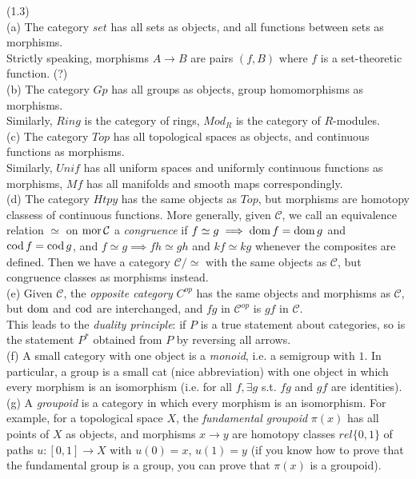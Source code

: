 \documentclass[a4paper]{article}
\begin{document}
\begin{eg} (1.3)\\
    (a) The category $set$ has all sets as objects, and all functions between sets as morphisms.\\
    Strictly speaking, morphisms $A \to B$ are pairs $(f,B)$ where $f$ is a set-theoretic function. (?)\\
    (b) The category $Gp$ has all groups as objects, group homomorphisms as morphisms.\\
    Similarly, $Ring$ is the category of rings, $Mod_R$ is the category of $R$-modules.\\
    (c) The category $Top$ has all topological spaces as objects, and continuous functions as morphisms.\\
    Similarly, $Unif$ has all uniform spaces and uniformly continuous functions as morphisms, $Mf$ has all manifolds and smooth maps correspondingly.\\
    (d) The category $Htpy$ has the same objects as $Top$, but morphisms are homotopy classess of continuous functions. More generally, given $\mathcal{C}$, we call an equivalence relation $\simeq$ on $\operatorname{mor} \mathcal{C}$ a \emph{congruence} if $f \simeq g \implies \operatorname{dom} f = \operatorname{dom} g$ and $\operatorname{cod} f = \operatorname{cod} g$, and $f \simeq g \implies fh \simeq gh$ and $kf \simeq kg$ whenever the composites are defined. Then we have a category $\mathcal{C} / \simeq$ with the same objects as $\mathcal{C}$, but congruence classes as morphisms instead.\\
    (e) Given $\mathcal{C}$, the \emph{opposite category} $C^{op}$ has the same objects and morphisms as $\mathcal{C}$, but $\operatorname{dom}$ and $\operatorname{cod}$ are interchanged, and $fg$ in $\mathcal{C}^{op}$ is $gf$ in $\mathcal{C}$.\\
    This leads to the \emph{duality principle}: if $P$ is a true statement about categories, so is the statement $P^*$ obtained from $P$ by reversing all arrows.\\
    (f) A small category with one object is a \emph{monoid}, i.e. a semigroup with $1$. In particular, a group is a small cat (nice abbreviation) with one object in which every morphism is an isomorphism (i.e. for all $f, \exists g$ s.t. $fg$ and $gf$ are identities).\\
    (g) A \emph{groupoid} is a category in which every morphism is an isomorphism. For example, for a topological space $X$, the \emph{fundamental groupoid} $\pi(x)$ has all points of $X$ as objects, and morphisms $x \to y$ are homotopy classes $rel\{0,1\}$ of paths $u:[0,1] \to X$ with $u(0) = x$, $u(1) = y$ (if you know how to prove that the fundamental group is a group, you can prove that $\pi(x)$ is a groupoid).\\

\end{eg}
\end{document}

